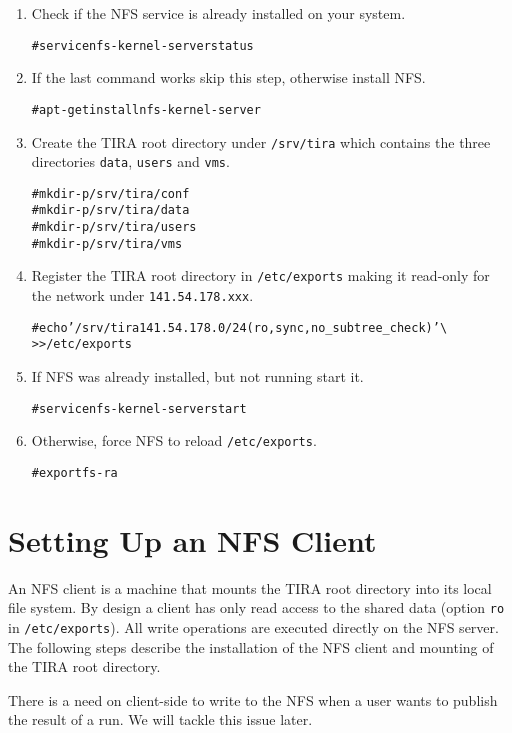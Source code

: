 \documentclass[12pt,a4paper,oneside,titlepage,draft]{report}
\newcommand{\tira}{TIRA\xspace}
\newenvironment{code}
  {\small\color{RubineRed}\begin{alltt}}
  {\end{alltt}}
\newenvironment{note}
  {\small\begin{mdframed}[backgroundcolor=yellow,linewidth=0,skipabove=3,skipbelow=4]}
  {\end{mdframed}}
\begin{document}
\begin{enumerate}
\item Check if the NFS service is already installed on your system.
\begin{code}
# service nfs-kernel-server status
\end{code}
\item If the last command works skip this step, otherwise install NFS.
\begin{code}
# apt-get install nfs-kernel-server
\end{code}
\item Create the \tira root directory under \texttt{/srv/tira} which contains the three directories \texttt{data}, \texttt{users} and \texttt{vms}.
\begin{code}
# mkdir -p /srv/tira/conf
# mkdir -p /srv/tira/data
# mkdir -p /srv/tira/users
# mkdir -p /srv/tira/vms
\end{code}
\item Register the \tira root directory in \texttt{/etc/exports} making it read-only for the network under \texttt{141.54.178.xxx}. 
\begin{code}
# echo '/srv/tira 141.54.178.0/24(ro,sync,no_subtree_check)' \textbackslash
  >> /etc/exports
\end{code}
\item If NFS was already installed, but not running start it.
\begin{code}
# service nfs-kernel-server start
\end{code}
\item Otherwise, force NFS to reload \texttt{/etc/exports}.
\begin{code}
# exportfs -ra
\end{code}
\end{enumerate}

\section{Setting Up an NFS Client}
An NFS client is a machine that mounts the \tira root directory into its local file system. By design a client has only read access to the shared data (option \texttt{ro} in \texttt{/etc/exports}). All write operations are executed directly on the NFS server. The following steps describe the installation of the NFS client and mounting of the \tira root directory.

\begin{note}
There is a need on client-side to write to the NFS when a user wants to publish the result of a run. We will tackle this issue later. 
\end{note}
\end{document}
